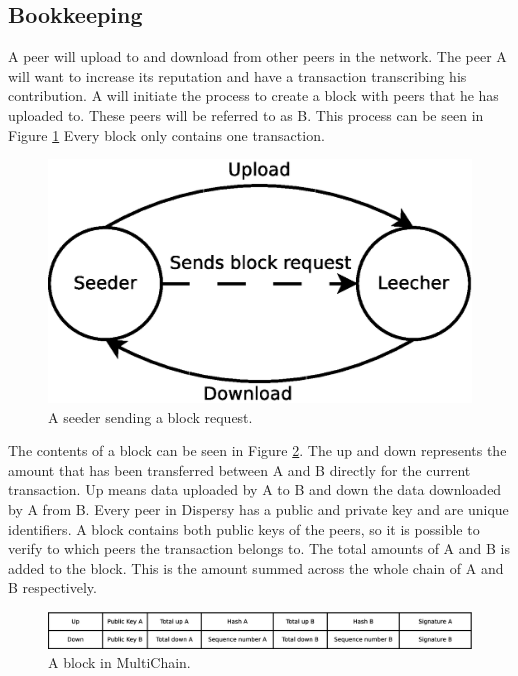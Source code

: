 \subsection{Bookkeeping}
A peer will upload to and download from other peers in the network.
The peer A will want to increase its reputation and have a transaction transcribing his contribution.
A will initiate the process to create a block with peers that he has uploaded to.
These peers will be referred to as B.
This process can be seen in Figure \ref{fig:seeder-leecher}
Every block only contains one transaction.

\begin{figure}
	\centerline{\includegraphics[scale=0.3]{design/figs/seeder-leecher.eps}}
	\caption{A seeder sending a block request.}
	\label{fig:seeder-leecher}
\end{figure}

The contents of a block can be seen in Figure \ref{fig:block}.
The up and down represents the amount that has been transferred between A and B directly for the current transaction.
Up means data uploaded by A to B and down the data downloaded by A from B.
Every peer in Dispersy has a public and private key and are unique identifiers.
A block contains both public keys of the peers,
so it is possible to verify to which peers the transaction belongs to.
The total amounts of A and B is added to the block.
This is the amount summed across the whole chain of A and B respectively.

\begin{figure}
	\centerline{\includegraphics[scale=0.3]{design/figs/block.eps}}
	\caption{A block in MultiChain.}
	\label{fig:block}
\end{figure}

